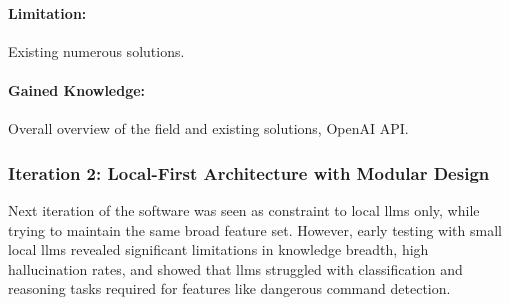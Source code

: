 \paragraph{Limitation:} Existing numerous solutions.
\paragraph{Gained Knowledge:} Overall overview of the field and
existing solutions,
OpenAI API.

\subsubsection{Iteration 2: Local-First Architecture with Modular Design}
Next iteration of the software was seen as constraint to local \glspl{llm} only,
while trying to maintain the same broad feature set. However, early testing with
small local \glspl{llm} revealed significant limitations in knowledge breadth,
high hallucination rates, and showed that \glspl{llm} struggled with
classification and reasoning tasks required for features like dangerous command
detection.

